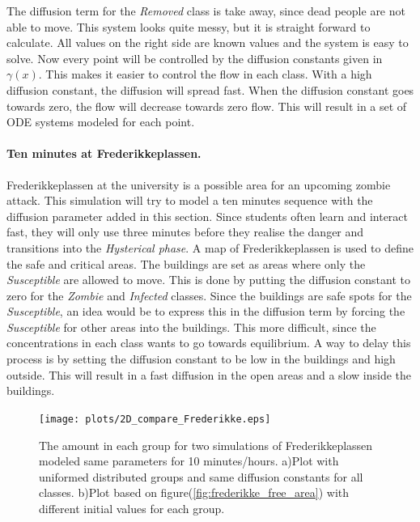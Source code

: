 \documentclass[%
twoside,                 %
final,                   %
10pt]{article}
\begin{document}
The diffusion term for the \emph{Removed} class is take away, since dead people are not able to move. This system looks quite messy, but it is straight forward to calculate. All values on the right side are known values and the system is easy to solve. Now every point will be controlled by the diffusion constants given in $\gamma(x)$. This makes it easier to control the flow in each class. With a high diffusion constant, the diffusion will spread fast. When the diffusion constant goes towards zero, the flow will decrease towards zero flow. This will result in a set of ODE systems modeled for each point.

\paragraph{Ten minutes at Frederikkeplassen.}
Frederikkeplassen at the university is a possible area for an upcoming zombie attack. This simulation will try to model a ten minutes sequence with the diffusion parameter added in this section. Since students often learn and interact fast, they will only use three minutes before they realise the danger and transitions into the \emph{Hysterical phase}. A map of Frederikkeplassen is used to define the safe and critical areas. The buildings are set as areas where only the \emph{Susceptible} are allowed to move. This is done by putting the diffusion constant to zero for the \emph{Zombie} and \emph{Infected} classes. Since the buildings are safe spots for the \emph{Susceptible}, an idea would be to express this in the diffusion term by forcing the \emph{Susceptible} for other areas into the buildings. This more difficult, since the concentrations in each class wants to go towards equilibrium. A way to delay this process is by setting the diffusion constant to be low in the buildings and high outside. This will result in a fast diffusion in the open areas and a slow inside the buildings. 


\begin{figure}[ht]
  \centerline{\texttt{[image: plots/2D\_compare\_Frederikke.eps]}}
  \caption{
  \label{fig:frederikke_numbers} The amount in each group for two simulations of Frederikkeplassen modeled same parameters for 10 minutes/hours. a)Plot with uniformed distributed groups and same diffusion constants for all classes. b)Plot based on figure(\ref{fig:frederikke_free_area}) with different initial values for each group.
  }
\end{figure}
\end{document}
